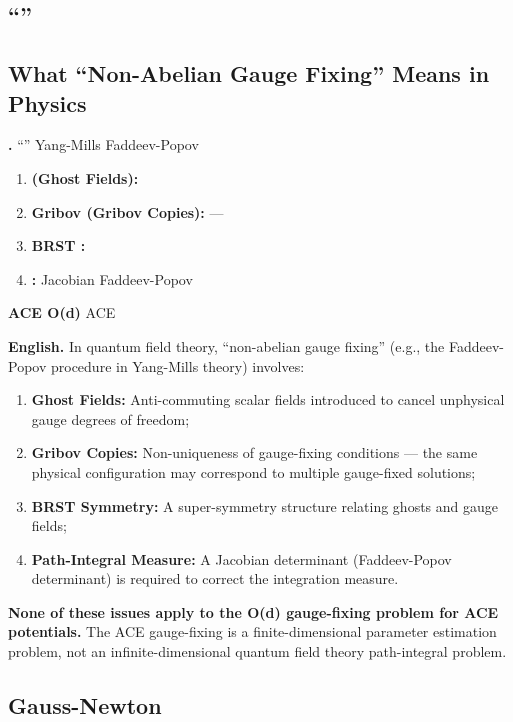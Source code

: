 \documentclass[11pt,a4paper]{article}
\theoremstyle{plain}
\theoremstyle{definition}
\theoremstyle{remark}
\begin{document}
\subsection{``'' }
\subsection*{What ``Non-Abelian Gauge Fixing'' Means in Physics}

\noindent
\textbf{.}
``'' Yang-Mills  Faddeev-Popov 


\begin{enumerate}[label=(\arabic*)]
  \item \textbf{ (Ghost Fields):} 
  \item \textbf{Gribov  (Gribov Copies):} —
        
  \item \textbf{BRST :} 
  \item \textbf{:}  Jacobian Faddeev-Popov 
\end{enumerate}

\textbf{ ACE  O(d) } ACE 


\medskip
\noindent
\textbf{English.}
In quantum field theory, ``non-abelian gauge fixing'' (e.g., the
Faddeev-Popov procedure in Yang-Mills theory) involves:

\begin{enumerate}[label=(\arabic*)]
  \item \textbf{Ghost Fields:} Anti-commuting scalar fields introduced to
        cancel unphysical gauge degrees of freedom;
  \item \textbf{Gribov Copies:} Non-uniqueness of gauge-fixing conditions —
        the same physical configuration may correspond to multiple gauge-fixed solutions;
  \item \textbf{BRST Symmetry:} A super-symmetry structure relating ghosts
        and gauge fields;
  \item \textbf{Path-Integral Measure:} A Jacobian determinant (Faddeev-Popov
        determinant) is required to correct the integration measure.
\end{enumerate}

\textbf{None of these issues apply to the O(d) gauge-fixing problem for ACE
potentials.} The ACE gauge-fixing is a finite-dimensional parameter estimation
problem, not an infinite-dimensional quantum field theory path-integral problem.

\subsection{Gauss-Newton }
\end{document}
